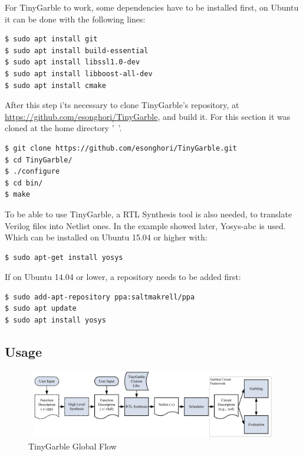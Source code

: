 \begin{refsection}
For TinyGarble to work, some dependencies have to be installed first, on Ubuntu it can be done with the following lines:

\begin{lstlisting}[caption={Installation of TinyGarble's dependencies}, language=bash, captionpos=b]
$ sudo apt install git
$ sudo apt install build-essential
$ sudo apt install libssl1.0-dev
$ sudo apt install libboost-all-dev
$ sudo apt install cmake
\end{lstlisting}

After this step i'ts necessary to clone TinyGarble's repository, at \url{https://github.com/esonghori/TinyGarble}, and build it. For this section it was cloned at the home directory '~'.

\begin{lstlisting}[caption={Configuration and compilation of TinyGarble. 'Sudo ./configure' and 'sudo make' may be needed.}, language=bash, captionpos=b]
$ git clone https://github.com/esonghori/TinyGarble.git
$ cd TinyGarble/
$ ./configure
$ cd bin/
$ make
\end{lstlisting}

To be able to use TinyGarble, a RTL Synthesis tool is also needed, to translate Verilog files into Netlist ones. In the example showed later, Yosys-abc is used. Which can be installed on Ubuntu 15.04 or higher with:

\begin{lstlisting}[caption={Installation of Yosys-abc for Ubuntu 15.04>}, language=bash, captionpos=b]
$ sudo apt-get install yosys
\end{lstlisting}

If on Ubuntu 14.04 or lower, a repository needs to be added first:

\begin{lstlisting}[caption={Installation of Yosys-abc for Ubuntu 14.04<}, language=bash, captionpos=b]
$ sudo add-apt-repository ppa:saltmakrell/ppa
$ sudo apt update
$ sudo apt install yosys
\end{lstlisting}

\newpage

\subsection{Usage}

\begin{figure}[H]
	\centering
	\includegraphics[width=1\textwidth, height=3cm]{./sdf/tiny_garble/figures/tiny_garble_flow.png}
    \caption{TinyGarble Global Flow\cite{Songhori}}\label{fig:tinygarble_flow}
\end{figure}


\end{refsection}
